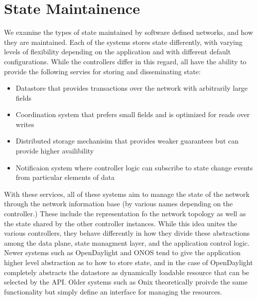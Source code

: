 \documentclass[letterpaper,twocolumn,10pt]{article}
\begin{document}

\section{State Maintainence}

We examine the types of state maintained by software defined networks, and how they are maintained. Each of the systems stores state differently, with varying levels of flexibility depending on the application and with different default configurations. While the controllers differ in this regard, all have the ability to provide the following servies for storing and disseminating state:

\begin{itemize}
\item Datastore that provides transactions over the network with arbitrarily large fields
\item Coordination system that prefers small fields and is optimized for reads over writes
\item Distributed storage mechanisim that provides weaker guarantees but can provide higher availibility
\item Notificaion system where controller logic can subscribe to state change events from particular elements of data
\end{itemize}

With these services, all of these systems aim to manage the state of the network through the network information base (by various names depending on the controller.) These include the representation fo the network topology as well as the state shared by the other controller instances. While this idea unites the various controllers, they behave differently in how they divide these abstractions among the data plane, state managment layer, and the application control
logic. Newer systems such as OpenDaylight and ONOS tend to give the application higher level abstraction as to how to store state, and in the case of OpenDaylight completely abstracts the datastore as dynamically loadable resource that can be selected by the API. Older systems such as Onix theoretically proivde the same functionality but simply define an interface for managing the resources. 
\end{document}
